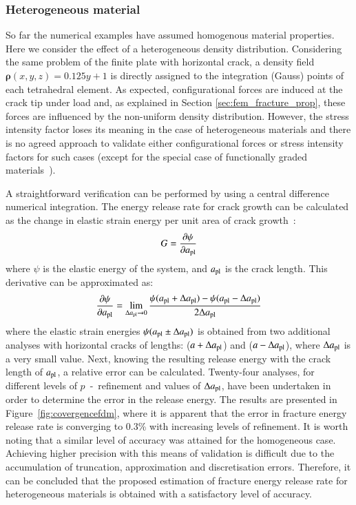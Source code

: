 \documentclass[review]{elsarticle}
\numberwithin{equation}{section}
\begin{document}
\subsubsection{Heterogeneous material}
So far the numerical examples have assumed homogenous material properties. Here we consider the effect of a heterogeneous density distribution. 
Considering the same problem of the finite plate with horizontal crack, a density field $\mathbf{\rho}(x,y,z) = 0.125y + 1$ is directly assigned to the integration (Gauss) points of each tetrahedral element.
As expected, configurational forces are induced at the crack tip under load and, as explained in Section \ref{sec:fem_fracture_prop}, these forces are influenced by the non-uniform density distribution. 
However, the stress intensity factor loses its meaning in the case of heterogeneous materials and there is no agreed approach to validate either configurational forces or stress intensity factors for such cases (except for the special case of functionally graded materials~\citep{kim2002finite}).

A straightforward verification can be performed by using a central difference numerical integration. The energy release rate for crack growth can be calculated as the change in elastic strain energy per unit area of crack growth~\citep{Griffith163}:
\begin{equation}
G = \frac{\partial \psi}{\partial a_{\rm {pl}}}
\end{equation}
where $\psi$ is the elastic energy of the system, and $a_{\rm{pl}}$ is the crack length. This derivative can be approximated as:
\begin{equation}
 \frac{\partial \psi}{\partial a_{\rm {pl}}} = \lim_{\Delta a_{\rm {pl}} \to 0} \frac{\psi(a_{\rm {pl}} + \Delta a_{\rm {pl}}) - \psi(a_{\rm {pl}} -\Delta a_{\rm {pl}})}{2\Delta a_{\rm {pl}}}
\end{equation}
where the elastic strain energies $\psi(a_{\rm {pl}} \pm \Delta a_{\rm {pl}})$ is obtained from two additional analyses with horizontal cracks of lengths: ($a + \Delta a_{\rm {pl}}$) and ($a - \Delta a_{\rm {pl}}$), where $\Delta a_{\rm {pl}}$ is a very small value. 
Next, knowing the resulting release energy with the crack length of $a_{\rm {pl}}$, a relative error can be calculated. 
Twenty-four analyses, for different levels of $p$~-~refinement and values of $\Delta a_{\rm {pl}}$, have been undertaken in order to determine the error in the release energy. 
The results are presented in Figure~\ref{fig:covergencefdm}, where it is apparent that the error in fracture energy release rate is converging to 0.3\% 
with increasing levels of refinement. It is worth noting that a similar level of accuracy was attained for the homogeneous case.  Achieving higher precision with this means of validation is difficult due to the accumulation of truncation, approximation and discretisation errors.
Therefore, it can be concluded that the proposed estimation of fracture energy release rate for heterogeneous materials is obtained with a satisfactory level of accuracy.
\end{document}
